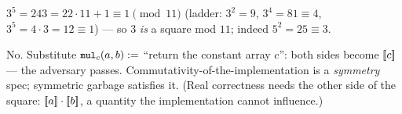  $3^5 = 243 = 22 \cdot 11 + 1 \equiv 1 \pmod{11}$
(ladder: $3^2 = 9$, $3^4 = 81 \equiv 4$, $3^5 = 4 \cdot 3 = 12 \equiv 1$)
--- so $3$ \emph{is} a square mod $11$; indeed $5^2 = 25 \equiv 3$.

 No. Substitute $\code{mul}_{c}(a,b) :=$ ``return the
constant array $c$'': both sides become $[\mkern-3.3mu[ c ]\mkern-3.3mu]$ --- the adversary
passes. Commutativity-of-the-implementation is a \emph{symmetry} spec;
symmetric garbage satisfies it. (Real correctness needs the other side
of the square: $[\mkern-3.3mu[ a ]\mkern-3.3mu] \cdot [\mkern-3.3mu[ b ]\mkern-3.3mu]$, a quantity the
implementation cannot influence.)
